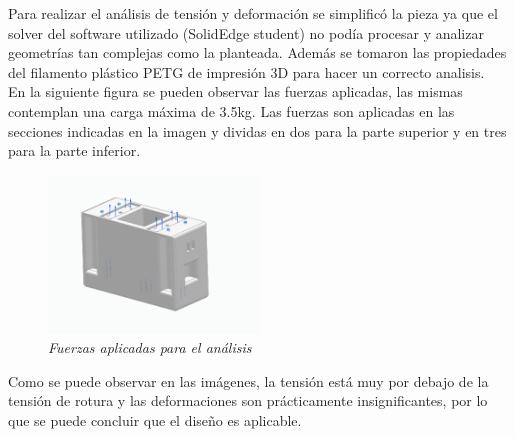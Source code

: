 Para realizar el análisis de tensión y deformación se simplificó la pieza ya que el solver del software utilizado (SolidEdge student) no podía procesar y analizar geometrías tan complejas como la planteada. Además se tomaron las propiedades del filamento plástico PETG de impresión 3D para hacer un correcto analisis.\\
En la siguiente figura se pueden observar las fuerzas aplicadas, las mismas contemplan una carga máxima de 3.5kg. Las fuerzas son aplicadas en las secciones indicadas en la imagen y dividas en dos para la parte superior y en tres para la parte inferior.\\
\begin{figure}[H]
    \centering
        \includegraphics[width=0.5\textwidth]{img/Fuerzas_superiores.png} \par
        \caption{\textit{Fuerzas aplicadas para el análisis}}
        \label{fig:fuerzas_sup}
\end{figure}
%    
Como se puede observar en las imágenes, la tensión está muy por debajo de la tensión de rotura y las deformaciones son prácticamente insignificantes, por lo que se puede concluir que el diseño es aplicable.\\
